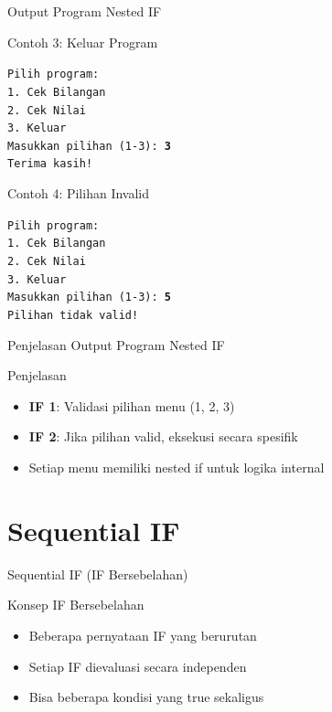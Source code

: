 \documentclass{beamer}
\begin{document}
\begin{frame}{Output Program Nested IF}
\begin{block}{Contoh 3: Keluar Program}
\colorbox{gray!20}{
    \parbox{0.9\textwidth}{
        \footnotesize\texttt{Pilih program:\\
        1. Cek Bilangan\\
        2. Cek Nilai\\
        3. Keluar\\
        Masukkan pilihan (1-3): \textbf{3}\\
        Terima kasih!}
    }
}
\end{block}

\begin{block}{Contoh 4: Pilihan Invalid}
\colorbox{gray!20}{
    \parbox{0.9\textwidth}{
        \footnotesize\texttt{Pilih program:\\
        1. Cek Bilangan\\
        2. Cek Nilai\\
        3. Keluar\\
        Masukkan pilihan (1-3): \textbf{5}\\
        Pilihan tidak valid!}
    }
}
\end{block}
\end{frame}

\begin{frame}{Penjelasan Output Program Nested IF}
\begin{block}{Penjelasan}
\begin{itemize}
\item \textbf{IF 1}: Validasi pilihan menu (1, 2, 3)
\item \textbf{IF 2}: Jika pilihan valid, eksekusi secara spesifik
\item Setiap menu memiliki nested if untuk logika internal
\end{itemize}
\end{block}
\end{frame}

\section{Sequential IF}
\begin{frame}[fragile]{Sequential IF (IF Bersebelahan)}
  \begin{block}{Konsep IF Bersebelahan}
    \begin{itemize}
      \item Beberapa pernyataan IF yang berurutan
      \item Setiap IF dievaluasi secara independen
      \item Bisa beberapa kondisi yang true sekaligus
    \end{itemize}
  \end{block}
\end{frame}
\end{document}
